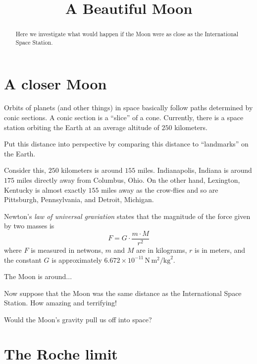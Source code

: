 \documentclass{ximera}
\title{A Beautiful Moon}
\begin{document}
\begin{abstract}
Here we investigate what would happen if the Moon were as close as the
International Space Station.
\end{abstract}
\maketitle

\section*{A closer Moon}

Orbits of planets (and other things) in space basically follow paths
determined by conic sections. A conic section is a ``slice'' of a
cone. Currently, there is a space station orbiting the Earth at an average
altitude of $250$ kilometers.

\begin{question}
Put this distance into perspective by comparing this distance to
``landmarks'' on the Earth.
\begin{solution}
\begin{freeResponse}
Consider this, $250$ kilometers is around $155$ miles. Indianapolis,
Indiana is around $175$ miles directly away from Columbus, Ohio. On
the other hand, Lexington, Kentucky is almost exactly $155$ miles away
as the crow-flies and so are Pittsburgh, Pennsylvania, and Detroit,
Michigan.
\end{freeResponse}
\end{solution}
\end{question}


Newton's \textit{law of universal graviation} states that the
magnitude of the force given by two masses is
\[
F = G \cdot \frac{m\cdot M}{r^2} 
\]
where $F$ is measured in netwons, $m$ and $M$ are in kilograms, $r$ is
in meters, and the constant $G$ is approximately $6.672\times
10^{-11}\, \mathrm{N}\, \mathrm{m}^2/\mathrm{kg}^2$.

The Moon is around...


Now suppose that the Moon was the same distance as the International
Space Station. How amazing and terrifying!

\begin{question}
Would the Moon's gravity pull us off into space? 
\end{question}

\section*{The Roche limit} %
\end{document}
